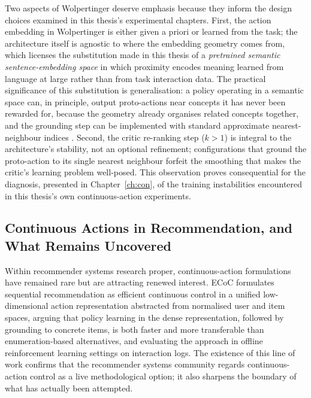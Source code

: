 Two aspects of Wolpertinger deserve emphasis because they inform the design choices examined in this thesis's experimental chapters. First, the action embedding in Wolpertinger is either given a priori or learned from the task; the architecture itself is agnostic to where the embedding geometry comes from, which licenses the substitution made in this thesis of a \textit{pretrained semantic sentence-embedding space} \citep{reimers2019sentence} in which proximity encodes meaning learned from language at large rather than from task interaction data. The practical significance of this substitution is generalisation: a policy operating in a semantic space can, in principle, output proto-actions near concepts it has never been rewarded for, because the geometry already organises related concepts together, and the grounding step can be implemented with standard approximate nearest-neighbour indices \citep{johnson2019billion}. Second, the critic re-ranking step ($k > 1$) is integral to the architecture's stability, not an optional refinement; configurations that ground the proto-action to its single nearest neighbour forfeit the smoothing that makes the critic's learning problem well-posed. This observation proves consequential for the diagnosis, presented in Chapter~\ref{ch:con}, of the training instabilities encountered in this thesis's own continuous-action experiments.

\subsection{Continuous Actions in Recommendation, and What Remains Uncovered}

Within recommender systems research proper, continuous-action formulations have remained rare but are attracting renewed interest. ECoC \citep{wang2024efficient} formulates sequential recommendation as efficient continuous control in a unified low-dimensional action representation abstracted from normalised user and item spaces, arguing that policy learning in the dense representation, followed by grounding to concrete items, is both faster and more transferable than enumeration-based alternatives, and evaluating the approach in offline reinforcement learning settings on interaction logs. The existence of this line of work confirms that the recommender systems community regards continuous-action control as a live methodological option; it also sharpens the boundary of what has actually been attempted.

